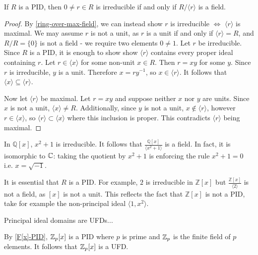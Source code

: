 \begin{prop}\label{PID-over-irreducible-is-field}
If $R$ is a PID, then $0\neq r\in R$ is irreducible if and only if $R/\langle r\rangle$ is a field.
\end{prop}
\begin{proof}
By \cref{ring-over-max-field}, we can instead show $r$ is irreducible $\iff$ $\langle r\rangle$ is maximal. We may assume $r$ is not a unit, as $r$ is a unit if and only if $\langle r\rangle=R$, and $R/R=\{0\}$ is not a field - we require two elements $0\neq 1$. Let $r$ be irreducible. Since $R$ is a PID, it is enough to show show $\langle r\rangle$ contains every proper ideal containing $r$. Let $r\in \langle x\rangle$ for some non-unit $x\in R$. Then $r=xy$ for some $y$. Since $r$ is irreducible, $y$ is a unit. Therefore $x=ry^{-1}$, so $x\in \langle r\rangle$. It follows that $\langle x\rangle \subseteq \langle r\rangle$.

Now let $\langle r \rangle$ be maximal. Let $r=xy$ and suppose neither $x$ nor $y$ are units. Since $x$ is not a unit, $\langle x\rangle \neq R$. Additionally, since $y$ is not a unit, $x\not \in \langle r\rangle$, however $r\in \langle x\rangle$, so $\langle r\rangle \subset \langle x\rangle$ where this inclusion is proper. This contradicts $\langle r\rangle$ being maximal.
\end{proof}

\begin{example}
In $\mathbb{Q}[x]$, $x^2+1$ is irreducible. It follows that $\frac{\mathbb{Q}[x]}{\langle x^2+1\rangle}$ is a field. In fact, it is isomorphic to $\mathbb{C}$: taking the quotient by $x^2+1$ is enforcing the rule $x^2+1=0$ i.e. $x=\sqrt{-1}$.
\end{example}

\begin{remark}
It is essential that $R$ is a PID. For example, $2$ is irreducible in $\mathbb{Z}[x]$ but $\frac{\mathbb{Z}[x]}{\langle 2\rangle}$ is not a field, as $[x]$ is not a unit. This reflects the fact that $\mathbb{Z}[x]$ is not a PID, take for example the non-principal ideal $\langle 1,x^2\rangle$.
\end{remark}

Principal ideal domains are UFDs...


\begin{example}\label{Z_p[x]-is-UFD}
By \cref{F[x]-PID}, $\mathbb{Z}_p[x]$ is a PID where $p$ is prime and $\mathbb{Z}_p$ is the finite field of $p$ elements. It follows that $\mathbb{Z}_p[x]$ is a UFD.
\end{example}

